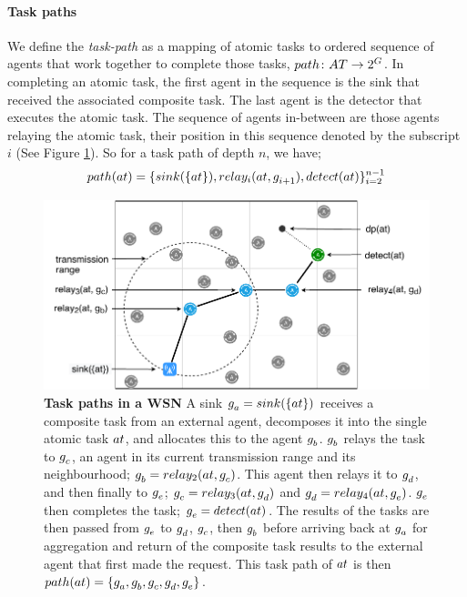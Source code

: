 
\paragraph{Task paths}
We define the \textit{task-path} as a mapping of atomic tasks to ordered sequence of agents that work together to complete those tasks, $\formalTaskArc{}{}$. In completing an atomic task, the first agent in the sequence is the sink that received the associated composite task. The last agent is the detector that executes the atomic task. The sequence of agents in-between are those agents relaying the atomic task, their position in this sequence denoted by the subscript $i$ (See Figure \ref{fig:grid_concept}). So for a task path of depth $n$, we have;
\begin{equation}
	\functionTaskArc{}{} = \lbrace \functionSinkRoleAtomic{}{}, \functionRelayRole{i}{}{i+1}, \functionDetectorRole{}{} \rbrace_{i=2}^{n-1}
\end{equation}
\begin{figure}
	\centering 
	\includegraphics[width=0.75\linewidth, trim={25pt 0pt 24pt 0pt, clip}]{grid_concept}
	\caption[Task paths in a WSN]{\textbf{Task paths in a WSN} A sink $\varAgent{a}{} = \functionSinkRoleAtomic{}{}$ receives a composite task from an external agent, decomposes it into the single atomic task $\varAtomicTask{}{}$, and allocates this to the agent $g_{b}^{}$. $g_{b}^{}$ relays the task to $g_{c}^{}$, an agent in its current transmission range and its neighbourhood;  $\varAgent{b}{} = \functionRelayRole{2}{}{c}$. This agent then relays it to $g_{d}^{}$, and then finally to $g_{e}^{}$; $\varAgent{c}{} = \functionRelayRole{3}{}{d}$ and $\varAgent{d}{} = \functionRelayRole{4}{}{e}$. $g_{e}^{}$ then  completes the task; $\varAgent{e}{} = \functionDetectorRole{}{}$. The results of the tasks are then passed from $g_{e}^{}$ to  $g_{d}^{}$, $g_{c}^{}$, then $g_{b}^{}$ before arriving back at $g_{a}^{}$ for aggregation and return of the composite task results to the external agent that first made the request. This task path of $\varAtomicTask{}{}$ is then $\functionTaskArc{}{} = \lbrace \varAgent{a}{}, \varAgent{b}{}, \varAgent{c}{}, \varAgent{d}{}, \varAgent{e}{} \rbrace$.
	}
	\label{fig:grid_concept}
\end{figure}
